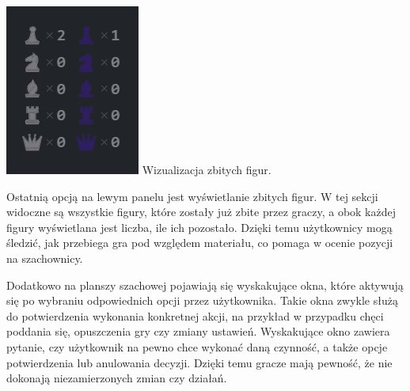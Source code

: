 \documentclass[12pt,a4paper]{article}
\begin{document}
\begin{minipage}[t]{0.2\textwidth} 
    \vspace{0pt} 
    \centering 
    \includegraphics[width=\linewidth]{images/ins_min_capt.png} 
    Wizualizacja zbitych figur.
\end{minipage} 
\hfill 
\begin{minipage}[t]{0.7\textwidth} 
    \vspace{0pt} 
    \raggedright 
    Ostatnią opcją na lewym panelu jest wyświetlanie zbitych figur. W tej sekcji widoczne są wszystkie figury, które zostały już zbite przez graczy, a obok każdej figury wyświetlana jest liczba, ile ich pozostało. Dzięki temu użytkownicy mogą śledzić, jak przebiega gra pod względem materiału, co pomaga w ocenie pozycji na szachownicy.
\end{minipage}

\newpage

\noindent
Dodatkowo na planszy szachowej pojawiają się wyskakujące okna, które aktywują się po wybraniu odpowiednich opcji przez użytkownika. Takie okna zwykle służą do potwierdzenia wykonania konkretnej akcji, na przykład w przypadku chęci poddania się, opuszczenia gry czy zmiany ustawień. Wyskakujące okno zawiera pytanie, czy użytkownik na pewno chce wykonać daną czynność, a także opcje potwierdzenia lub anulowania decyzji. Dzięki temu gracze mają pewność, że nie dokonają niezamierzonych zmian czy działań.
\end{document}
